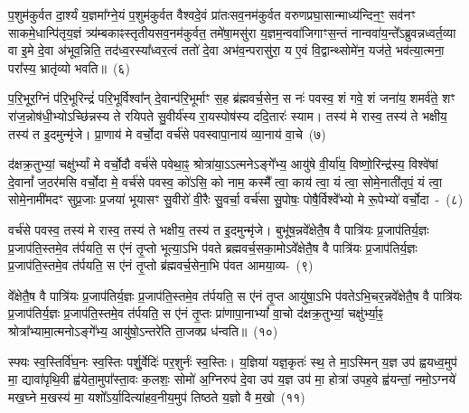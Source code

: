 प॒शुम॑कुर्वत दा॒र्श्यं य॒ज्ञमा᳚ग्ने॒यं प॒शुम॑कुर्वत वैश्वदे॒वं प्रा॑तःसव॒नम॑कुर्वत वरुणप्रघा॒सान्माध्य॑न्दिन॒ꣳ॒ सव॑नꣳ साक\-मे॒धान्पि॑तृय॒ज्ञं त्र्य॑म्बकाꣴस्तृतीयसव॒नम॑कुर्वत॒ तमे॑षा॒मसु॑रा य॒ज्ञम॒न्व\-वा॑जिगाꣳ\-स॒न्तं नान्ववा॑य॒न्ते᳚\-ऽब्रुवन्नध्वर्त॒व्या वा इ॒मे दे॒वा अ॑भूव॒न्निति॒ तद॑ध्व॒रस्या᳚ध्वर॒त्वं ततो॑ दे॒वा अभ॑व॒न्परासु॑रा॒ य ए॒वं वि॒द्वान्थ्सोमे॑न॒ यज॑ते॒ भव॑त्या॒त्मना॒ परा᳚स्य॒ भ्रातृ॑व्यो भवति॥~(६)

{\anuvakamend[{अप॑श्यन्तो\-ऽग्नीषो॒मीय॑मा॒त्मना॒ परा॒ त्रीणि॑ च}]}%

प॒रि॒भूर॒ग्निं प॑रि॒भूरिन्द्रं॑ परि॒भूर्विश्वा᳚न् दे॒वान्प॑रि॒भूर्माꣳ स॒ह ब्र॑ह्मवर्च॒सेन॒ स नः॑ पवस्व॒ शं गवे॒ शं जना॑य॒ शमर्व॑ते॒ शꣳ रा॑ज॒न्नोष॑धी॒भ्यो\-ऽच्छि॑न्नस्य ते रयिपते सु॒वीर्य॑स्य रा॒यस्पोष॑स्य ददि॒तारः॑ स्याम। तस्य॑ मे रास्व॒ तस्य॑ ते भक्षीय॒ तस्य॑ त इ॒दमुन्मृ॑जे। प्रा॒णाय॑ मे वर्चो॒दा वर्च॑से पवस्वापा॒नाय॑ व्या॒नाय॑ वा॒चे~(७)

द॑क्षक्र॒तुभ्यां॒ चक्षु॑र्भ्यां मे वर्चो॒दौ वर्च॑से पवेथा॒ꣴ॒ श्रोत्रा॑या॒\-ऽऽ\-त्मने\-ऽङ्गे᳚भ्य॒ आयु॑षे वी॒र्या॑य॒ विष्णो॒रिन्द्र॑स्य॒ विश्वे॑षां दे॒वानां᳚ ज॒ठर॑मसि वर्चो॒दा मे॒ वर्च॑से पवस्व॒ को॑\-ऽसि॒ को नाम॒ कस्मै᳚ त्वा॒ काय॑ त्वा॒ यं त्वा॒ सोमे॒नाती॑तृपं॒ यं त्वा॒ सोमे॒नामी॑मदꣳ सुप्र॒जाः प्र॒जया॑ भूयासꣳ सु॒वीरो॑ वी॒रैः सु॒वर्चा॒ वर्च॑सा सु॒पोषः॒ पोषै॒र्विश्वे᳚भ्यो मे रू॒पेभ्यो॑ वर्चो॒दा~-~(८)

वर्च॑से पवस्व॒ तस्य॑ मे रास्व॒ तस्य॑ ते भक्षीय॒ तस्य॑ त इ॒दमुन्मृ॑जे। बुभू॑ष॒न्नवे᳚क्षेतै॒ष वै पात्रि॑यः प्र॒जा\-प॑तिर्य॒ज्ञः प्र॒जा\-प॑ति॒स्तमे॒व त॑र्पयति॒ स ए॑नं तृ॒प्तो भूत्या॒\-ऽभि प॑वते ब्रह्मवर्च॒सका॒मो\-ऽवे᳚क्षेतै॒ष वै पात्रि॑यः प्र॒जा\-प॑तिर्य॒ज्ञः प्र॒जा\-प॑ति॒स्तमे॒व त॑र्पयति॒ स ए॑नं तृ॒प्तो ब्र॑ह्मवर्च॒सेना॒भि प॑वत आमया॒व्य-~(९)

वे᳚क्षेतै॒ष वै पात्रि॑यः प्र॒जा\-प॑तिर्य॒ज्ञः प्र॒जा\-प॑ति॒स्तमे॒व त॑र्पयति॒ स ए॑नं तृ॒प्त आयु॑षा॒ऽभि प॑वते\-ऽभि॒चर॒न्नवे᳚क्षेतै॒ष वै पात्रि॑यः प्र॒जा\-प॑तिर्य॒ज्ञः प्र॒जा\-प॑ति॒स्तमे॒व त॑र्पयति॒ स ए॑नं तृ॒प्तः प्रा॑णापा॒ना\-भ्यां᳚ वा॒चो द॑क्षक्र॒तुभ्यां॒ चक्षु॑र्भ्या॒ꣴ॒ श्रोत्रा᳚भ्यामा॒त्मनो\-ऽङ्गे᳚भ्य॒ आयु॑षो॒\-ऽन्तरे॑ति ता॒जक्प्र ध॑न्वति॥~(१०)

{\anuvakamend[{वा॒चे रू॒पेभ्यो॑ वर्चो॒दा आ॑मया॒वी पञ्च॑चत्वारिꣳशच्च}]}%

स्फ्यः स्व॒स्तिर्वि॑घ॒नः स्व॒स्तिः पर्\mbox{}शु॒र्वेदिः॑ पर॒शुर्नः॑ स्व॒स्तिः। य॒ज्ञिया॑ यज्ञ॒कृतः॑ स्थ॒ ते मा॒ऽस्मिन् य॒ज्ञ उप॑ ह्वयध्व॒मुप॑ मा॒ द्यावा॑पृथि॒वी ह्व॑येता॒मुपा᳚स्ता॒वः क॒लशः॒ सोमो॑ अ॒ग्निरुप॑ दे॒वा उप॑ य॒ज्ञ उप॑ मा॒ होत्रा॑ उपह॒वे ह्व॑यन्तां॒ नमो॒\-ऽग्नये॑ मख॒घ्ने म॒खस्य॑ मा॒ यशो᳚\-ऽर्या॒दित्या॑हव॒नीय॒मुप॑ तिष्ठते य॒ज्ञो वै म॒खो~(११)

